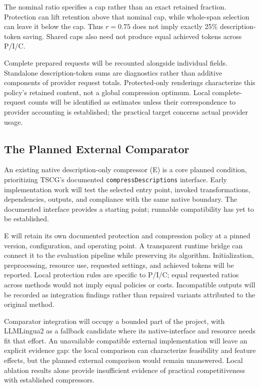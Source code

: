 \documentclass[conference]{IEEEtran}
\begin{document}
The nominal ratio specifies a cap rather than an exact retained fraction. Protection can lift retention above that nominal cap, while whole-span selection can leave it below the cap. Thus $r=0.75$ does not imply exactly 25\% description-token saving. Shared caps also need not produce equal achieved tokens across P/I/C.

Complete prepared requests will be recounted alongside individual fields. Standalone description-token sums are diagnostics rather than additive components of provider request totals. Protected-only renderings characterize this policy's retained content, not a global compression optimum. Local complete-request counts will be identified as estimates unless their correspondence to provider accounting is established; the practical target concerns actual provider usage.

\subsection{The Planned External Comparator}
An existing native description-only compressor (E) is a core planned condition, prioritizing TSCG's documented \texttt{compressDescriptions} interface. Early implementation work will test the selected entry point, invoked transformations, dependencies, outputs, and compliance with the same native boundary. The documented interface provides a starting point; runnable compatibility has yet to be established.

E will retain its own documented protection and compression policy at a pinned version, configuration, and operating point. A transparent runtime bridge can connect it to the evaluation pipeline while preserving its algorithm. Initialization, preprocessing, resource use, requested settings, and achieved tokens will be reported. Local protection rules are specific to P/I/C; equal requested ratios across methods would not imply equal policies or costs. Incompatible outputs will be recorded as integration findings rather than repaired variants attributed to the original method.

Comparator integration will occupy a bounded part of the project, with LLMLingua2 as a fallback candidate where its native-interface and resource needs fit that effort. An unavailable compatible external implementation will leave an explicit evidence gap: the local comparison can characterize feasibility and feature effects, but the planned external comparison would remain unanswered. Local ablation results alone provide insufficient evidence of practical competitiveness with established compressors.
\end{document}
